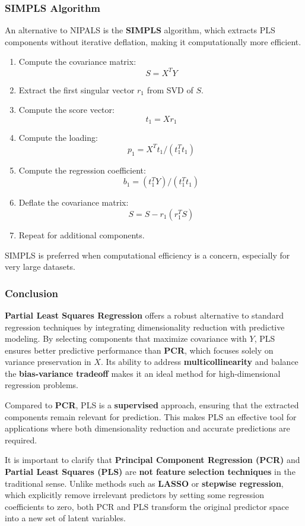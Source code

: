 \documentclass[11pt,twoside,a4paper]{article}
\begin{document}
\subsubsection{SIMPLS Algorithm}
An alternative to NIPALS is the \textbf{SIMPLS} algorithm, which extracts PLS components without iterative deflation, making it computationally more efficient.

\begin{enumerate}
    \item Compute the covariance matrix:
        \[
        S = X^T Y
        \]
    \item Extract the first singular vector \( r_1 \) from SVD of \( S \).
    \item Compute the score vector:
        \[
        t_1 = Xr_1
        \]
    \item Compute the loading:
        \[
        p_1 = X^T t_1 / (t_1^T t_1)
        \]
    \item Compute the regression coefficient:
        \[
        b_1 = (t_1^T Y) / (t_1^T t_1)
        \]
    \item Deflate the covariance matrix:
        \[
        S = S - r_1 (r_1^T S)
        \]
    \item Repeat for additional components.
\end{enumerate}

SIMPLS is preferred when computational efficiency is a concern, especially for very large datasets.

\subsubsection{Conclusion}
\textbf{Partial Least Squares Regression} offers a robust alternative to standard regression techniques by integrating dimensionality reduction with predictive modeling. By selecting components that maximize covariance with \( Y \), PLS ensures better predictive performance than \textbf{PCR}, which focuses solely on variance preservation in \( X \). Its ability to address \textbf{multicollinearity} and balance the \textbf{bias-variance tradeoff} makes it an ideal method for high-dimensional regression problems. 

Compared to \textbf{PCR}, PLS is a \textbf{supervised} approach, ensuring that the extracted components remain relevant for prediction. This makes PLS an effective tool for applications where both dimensionality reduction and accurate predictions are required.

It is important to clarify that \textbf{Principal Component Regression (PCR)} and \textbf{Partial Least Squares (PLS)} are \textbf{not feature selection techniques} in the traditional sense. Unlike methods such as \textbf{LASSO} or \textbf{stepwise regression}, which explicitly remove irrelevant predictors by setting some regression coefficients to zero, both PCR and PLS transform the original predictor space into a new set of latent variables.
\end{document}
